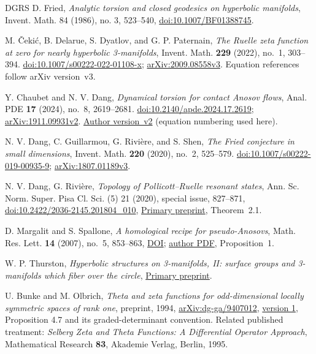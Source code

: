 \documentclass[11pt,letterpaper,reqno]{amsart}
\theoremstyle{remark}
\begin{document}
\begin{thebibliography}{DGRS}
 D. Fried,
\emph{Analytic torsion and closed geodesics on hyperbolic manifolds},
Invent. Math. 84 (1986), no. 3, 523--540,
\href{https://doi.org/10.1007/BF01388745}{doi:10.1007/BF01388745}.

 M. \v{C}eki\'c, B. Delarue, S. Dyatlov, and G. P. Paternain,
\emph{The Ruelle zeta function at zero for nearly hyperbolic 3-manifolds},
Invent. Math. \textbf{229} (2022), no.~1, 303--394.
\href{https://doi.org/10.1007/s00222-022-01108-x}{doi:10.1007/s00222-022-01108-x};
\href{https://arxiv.org/abs/2009.08558v3}{arXiv:2009.08558v3}.
Equation references follow arXiv version~v3.

 Y. Chaubet and N. V. Dang,
\emph{Dynamical torsion for contact Anosov flows},
Anal. PDE \textbf{17} (2024), no.~8, 2619--2681.
\href{https://doi.org/10.2140/apde.2024.17.2619}{doi:10.2140/apde.2024.17.2619};
\href{https://arxiv.org/abs/1911.09931v2}{arXiv:1911.09931v2}.
\href{https://arxiv.org/html/1911.09931v2}{Author version~v2}
(equation numbering used here).

 N. V. Dang, C. Guillarmou, G. Rivi\`ere, and S. Shen,
\emph{The Fried conjecture in small dimensions},
Invent. Math. \textbf{220} (2020), no.~2, 525--579.
\href{https://doi.org/10.1007/s00222-019-00935-9}{doi:10.1007/s00222-019-00935-9};
\href{https://arxiv.org/abs/1807.01189v3}{arXiv:1807.01189v3}.

 N. V. Dang, G. Rivi\`ere,
\emph{Topology of Pollicott--Ruelle resonant states},
Ann. Sc. Norm. Super. Pisa Cl. Sci. (5) 21 (2020), special issue,
827--871,
\href{https://doi.org/10.2422/2036-2145.201804_010}{doi:10.2422/2036-2145.201804\_010},
\href{https://arxiv.org/abs/1703.08037}{Primary preprint}, Theorem~2.1.

 D. Margalit and S. Spallone,
\emph{A homological recipe for pseudo-Anosovs},
Math. Res. Lett. \textbf{14} (2007), no.~5, 853--863,
\href{https://doi.org/10.4310/MRL.2007.v14.n5.a12}{DOI};
\href{https://margalit.droppages.net/papers/homcrit.pdf}{author PDF},
Proposition~1.

 W. P. Thurston,
\emph{Hyperbolic structures on 3-manifolds, II: surface groups and
3-manifolds which fiber over the circle},
\href{https://arxiv.org/abs/math/9801045}{Primary preprint}.

 U. Bunke and M. Olbrich,
\emph{Theta and zeta functions for odd-dimensional locally symmetric
spaces of rank one}, preprint, 1994,
\href{https://arxiv.org/abs/dg-ga/9407012}{arXiv:dg-ga/9407012},
\href{https://arxiv.org/html/dg-ga/9407012v1}{version 1},
Proposition 4.7 and its graded-determinant convention.
Related published treatment: \emph{Selberg Zeta and Theta Functions:
A Differential Operator Approach}, Mathematical Research \textbf{83},
Akademie Verlag, Berlin, 1995.
\end{thebibliography}
\end{document}
